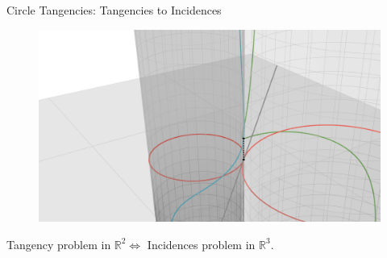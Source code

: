 \documentclass{beamer}
\newcommand{\RR}{\mathbb R}
\newcommand{\nfr}[1]{\begin{frame} #1
\end{frame}}
\begin{document}
\nfr{{Circle Tangencies: Tangencies to Incidences}

\begin{figure}[h]
    \centering
    \includegraphics[width=0.8
    \textwidth, trim={5cm 0 4cm 2cm}, clip=true]{images/Diagram4c.png}
\end{figure}



Tangency problem in $\RR^2 \iff $ Incidences problem in $\RR^3$.
}
\end{document}
